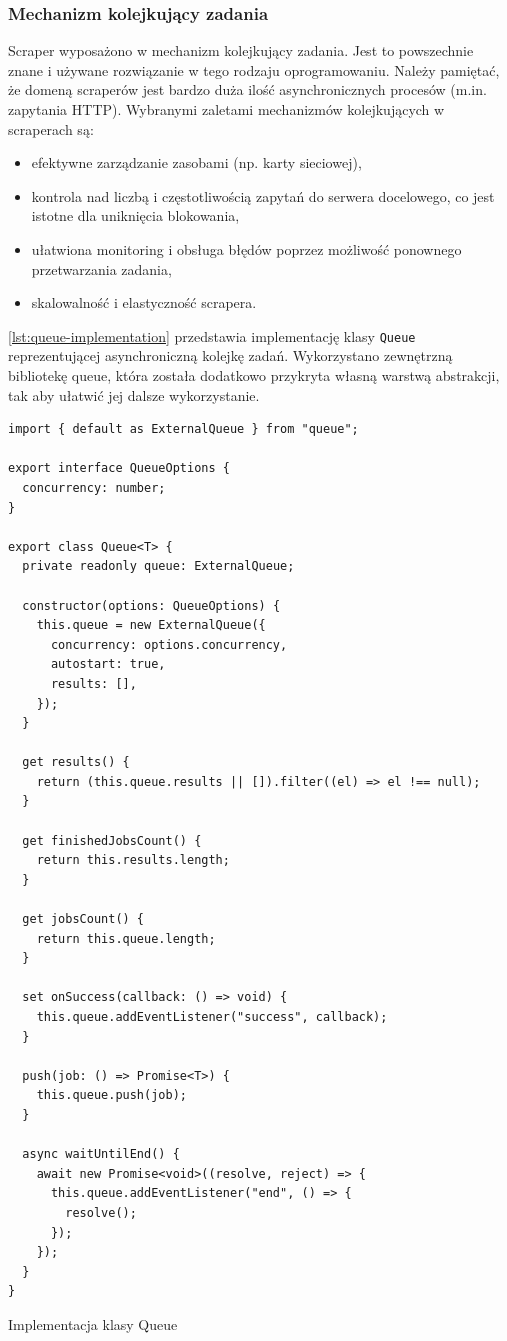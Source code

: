 \subsubsection{Mechanizm kolejkujący zadania}

Scraper wyposażono w mechanizm kolejkujący zadania.
Jest to powszechnie znane i używane rozwiązanie w tego rodzaju oprogramowaniu.
Należy pamiętać, że domeną scraperów jest bardzo duża ilość asynchronicznych procesów (m.in. zapytania HTTP).
Wybranymi zaletami mechanizmów kolejkujących w scraperach są:
\begin{itemize}
    \item efektywne zarządzanie zasobami (np. karty sieciowej),
    \item kontrola nad liczbą i częstotliwością zapytań do serwera docelowego, co jest istotne dla uniknięcia blokowania,
    \item ułatwiona monitoring i obsługa błędów poprzez możliwość ponownego przetwarzania zadania,
    \item skalowalność i elastyczność scrapera.
\end{itemize}
\noindent \autoref{lst:queue-implementation} przedstawia implementację klasy \texttt{Queue} reprezentującej asynchroniczną kolejkę zadań.
Wykorzystano zewnętrzną bibliotekę queue, która została dodatkowo przykryta własną warstwą abstrakcji, tak aby ułatwić jej dalsze wykorzystanie.

\begin{listing}[p]
    \begin{verbatim}
import { default as ExternalQueue } from "queue";

export interface QueueOptions {
  concurrency: number;
}

export class Queue<T> {
  private readonly queue: ExternalQueue;

  constructor(options: QueueOptions) {
    this.queue = new ExternalQueue({
      concurrency: options.concurrency,
      autostart: true,
      results: [],
    });
  }

  get results() {
    return (this.queue.results || []).filter((el) => el !== null);
  }

  get finishedJobsCount() {
    return this.results.length;
  }

  get jobsCount() {
    return this.queue.length;
  }

  set onSuccess(callback: () => void) {
    this.queue.addEventListener("success", callback);
  }

  push(job: () => Promise<T>) {
    this.queue.push(job);
  }

  async waitUntilEnd() {
    await new Promise<void>((resolve, reject) => {
      this.queue.addEventListener("end", () => {
        resolve();
      });
    });
  }
}

    \end{verbatim}
    \caption{Implementacja klasy Queue}
    \label{lst:queue-implementation}
\end{listing}

